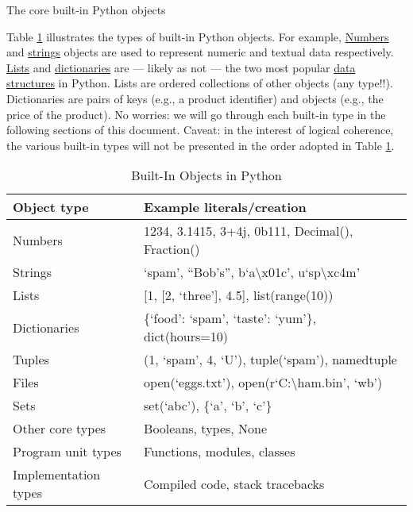 \documentclass[a4paper,11pt]{book}
\numberwithin{figure}{chapter}
\numberwithin{table}{chapter}
\newcommand{\question}[1]{%
    \begin{tcolorbox}[colback=comp_c!10,colframe=comp_c,sidebyside align=top,width=\linewidth,before skip=1ex]
        #1
    \end{tcolorbox}
    \switchcolumn%
}
\newcommand{\note}[1]{%
    \begin{tcolorbox}[colback=white!0,colframe=white!10,width=\linewidth,before skip=1ex]
        #1
    \end{tcolorbox}
}
\begin{document}
\begin{paracol}{2}
    \question{\raggedright The core built-in Python objects} 
	\note{Table \ref{tab:built_in_objects} illustrates the types of built-in Python objects. For example, \href{https://docs.python.org/3/tutorial/introduction.html\#numbers}{Numbers} and \href{https://docs.python.org/3/tutorial/introduction.html\#strings}{strings} objects are used to represent numeric and textual data respectively. \href{https://docs.python.org/3/tutorial/introduction.html\#lists}{Lists} and \href{https://docs.python.org/3/tutorial/datastructures.html\#dictionaries}{dictionaries} are --- likely as not --- the two most popular \href{https://docs.python.org/3/tutorial/datastructures.html}{data structures} in Python. Lists are ordered collections of other objects (any type!!). Dictionaries are pairs of keys (e.g., a product identifier) and objects (e.g., the price of the product). No worries: we will go through each built-in type in the following sections of this document. Caveat: in the interest of logical coherence, the various built-in types will not be presented in the order adopted in Table \ref{tab:built_in_objects}.} 
\end{paracol}

\begin{table}[!htbp]
\centering
\caption{Built-In Objects in Python}
\label{tab:built_in_objects}
\begin{tabular}{@{}ll@{}}
\toprule \toprule
Object type          & Example literals/creation                                            \\ \midrule
Numbers              & 1234, 3.1415, 3+4j, 0b111, Decimal(), Fraction()                     \\
Strings              & `spam', ``Bob's'', b`a\textbackslash{}x01c', u`sp\textbackslash{}xc4m' \\
Lists                & {[}1, {[}2, `three'{]}, 4.5{]}, list(range(10))                      \\
Dictionaries         & \{`food': `spam', `taste': `yum'\}, dict(hours=10)                   \\
Tuples               & (1, `spam', 4, `U'), tuple(`spam'), namedtuple                       \\
Files                & open(`eggs.txt'), open(r`C:\textbackslash{}ham.bin', `wb')           \\
Sets                 & set(`abc'), \{`a', `b', `c'\}                                        \\
Other core types     & Booleans, types, None                                                \\
Program unit types   & Functions, modules, classes                                          \\
Implementation types & Compiled code, stack tracebacks                                      \\ \bottomrule
\end{tabular}
\end{table}
\end{document}
